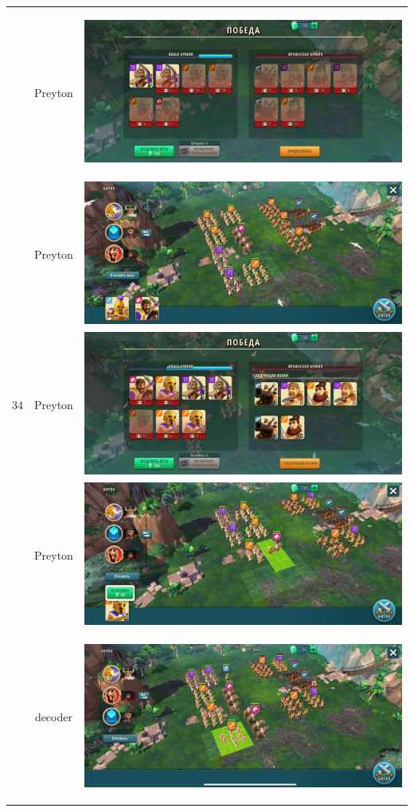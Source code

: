 \begin{longtable}{|c|c|c|}
	\hline
	\multirow{12}{*}{34} & Preyton &
	\hypertarget{fight34}{\includegraphics[width=0.75\linewidth]{./parts/media/TreasureHunt/34/Preyton/34_2.jpg}} \\
	& Preyton &
	\includegraphics[width=0.75\linewidth]{./parts/media/TreasureHunt/34/Preyton/34.1.jpg} \\
	& Preyton &
	\includegraphics[width=0.75\linewidth]{./parts/media/TreasureHunt/34/Preyton/34_1.jpg} \\
	& Preyton &
	\includegraphics[width=0.75\linewidth]{./parts/media/TreasureHunt/34/Preyton/34.2.jpg} \\
	\hline
	\multirow{12}{*}{34} & decoder &
	\hypertarget{fight34}{\includegraphics[width=0.75\linewidth]{./parts/media/TreasureHunt/34/decoder/photo_2022-04-07_10-02-46.jpg}} \\

\end{longtable}
